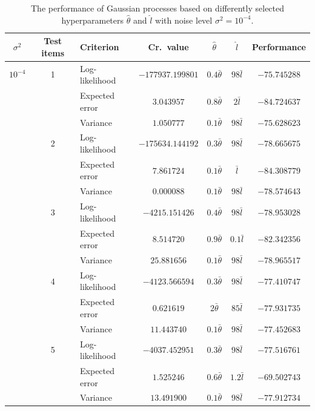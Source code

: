 \documentclass[a4paper,11pt]{article}
\begin{document}
\begin{table}
  \caption{The performance of Gaussian processes based on differently selected hyperparameters $\hat\theta$ and $\hat l$ with noise level $\sigma^2=10^{-4}$.}
  \label{tab:s4}
  \begin{tabular}{cclcccc}
    \hline
    $\sigma^2$ & Test items & Criterion & Cr.\ value & $\hat\theta$ & $\hat l$ & Performance \\
    \hline
    \hline
    $10^{-4}$ & 1 & Log-likelihood & $-177937.199801$ & $0.4\bar\theta$ & $98 \bar l$ & $-75.745288$ \\
              &   & Expected error & $3.043957$ & $0.8\bar\theta$ & $2\bar l$ & $-84.724637$ \\
              &   & Variance & $1.050777$ & $0.1\bar\theta$ & $98\bar l$ & $-75.628623$ \\
    \hline
              & 2 & Log-likelihood & $-175634.144192$ & $0.3\bar\theta$ & $98 \bar l$ & $-78.665675$ \\
              &   & Expected error & $7.861724$ & $0.1\bar\theta$ & $\bar l$ & $-84.308779$ \\
              &   & Variance & $0.000088$ & $0.1\bar\theta$ & $98\bar l$ & $-78.574643$ \\
    \hline
              & 3 & Log-likelihood & $-4215.151426$ & $0.4\bar\theta$ & $98 \bar l$ & $-78.953028$ \\
              &   & Expected error & $8.514720$ & $0.9\bar\theta$ & $0.1\bar l$ & $-82.342356$ \\
              &   & Variance & $25.881656$ & $0.1\bar\theta$ & $98\bar l$ & $-78.965517$ \\
    \hline
              & 4 & Log-likelihood & $-4123.566594$ & $0.3\bar\theta$ & $98 \bar l$ & $-77.410747$ \\
              &   & Expected error & $0.621619$ & $2\bar\theta$ & $85\bar l$ & $-77.931735$ \\
              &   & Variance & $11.443740$ & $0.1\bar\theta$ & $98\bar l$ & $-77.452683$ \\
    \hline
              & 5 & Log-likelihood & $-4037.452951$ & $0.3\bar\theta$ & $98 \bar l$ & $-77.516761$ \\
              &   & Expected error & $1.525246$ & $0.6\bar\theta$ & $1.2 \bar l$ & $-69.502743$ \\
              &   & Variance & $13.491900$ & $0.1\bar\theta$ & $98\bar l$ & $-77.912734$ \\
    \hline
  \end{tabular}
\end{table}
\end{document}

